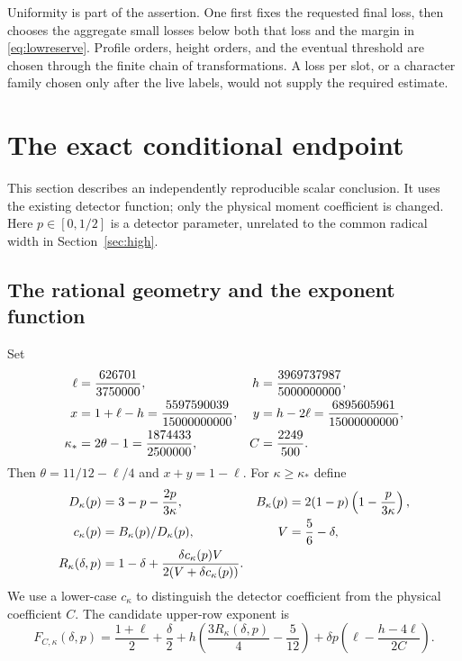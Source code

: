 \documentclass[11pt]{article}
\theoremstyle{definition}
\begin{document}
Uniformity is part of the assertion. One first fixes the requested
final loss, then chooses the aggregate small losses below both that
loss and the margin in \eqref{eq:lowreserve}. Profile orders, height
orders, and the eventual threshold are chosen through the finite chain
of transformations. A loss per slot, or a character family chosen only
after the live labels, would not supply the required estimate.

\section{The exact conditional endpoint}\label{sec:endpoint}

This section describes an independently reproducible scalar conclusion.
It uses the existing detector function; only the physical moment
coefficient is changed. Here $p\in[0,1/2]$ is a detector parameter,
unrelated to the common radical width in Section~\ref{sec:high}.

\subsection{The rational geometry and the exponent function}
Set
\begin{align}\label{eq:geometry}
 \ell&=\frac{626701}{3750000}, &
 h&=\frac{3969737987}{5000000000},\notag\\
 x&=1+\ell-h=\frac{5597590039}{15000000000}, &
 y&=h-2\ell=\frac{6895605961}{15000000000},\notag\\
 \kappa_*&=2\theta-1=\frac{1874433}{2500000}, &
 C&=\frac{2249}{500}.
\end{align}
Then $\theta=11/12-\ell/4$ and $x+y=1-\ell$.
For $\kappa\ge\kappa_*$ define
\begin{align}\label{eq:detector}
 D_\kappa(p)&=3-p-\frac{2p}{3\kappa}, &
 B_\kappa(p)&=2(1-p)\left(1-\frac{p}{3\kappa}\right),\notag\\
 c_\kappa(p)&=B_\kappa(p)/D_\kappa(p), &
 V&=\frac56-\delta,\notag\\
 R_\kappa(\delta,p)&=1-\delta+
       \frac{\delta c_\kappa(p)V}{2(V+\delta c_\kappa(p))}.
\end{align}
We use a lower-case $c_\kappa$ to distinguish the detector coefficient
from the physical coefficient $C$. The candidate upper-row exponent is
\begin{equation}\label{eq:F}
 F_{C,\kappa}(\delta,p)=\frac{1+\ell}{2}+\frac\delta2
 +h\left(\frac{3R_\kappa(\delta,p)}4-\frac5{12}\right)
 +\delta p\left(\ell-\frac{h-4\ell}{2C}\right).
\end{equation}
\end{document}

